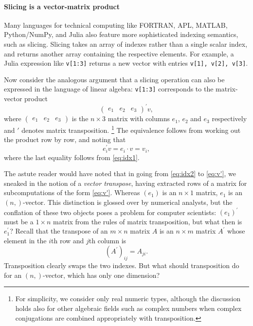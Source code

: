\paragraph{Slicing is a vector-matrix product}
Many languages for technical computing like FORTRAN, APL, MATLAB, Python/NumPy,
and Julia also feature more sophisticated indexing semantics, such as slicing.
Slicing takes an array of indexes rather than a single scalar index, and returns
another array containing the respective elements. For example, a Julia
expression like \lstinline|v[1:3]| returns a new vector with entries
\lstinline|v[1], v[2], v[3]|.

Now consider the analogous argument that a slicing operation can also be
expressed in the language of linear algebra: \lstinline|v[1:3]| corresponds to
the matrix-vector product
\begin{equation}
	\begin{pmatrix}e_1 & e_2 & e_3\end{pmatrix}^\prime v,\label{eq:idx2}
\end{equation}
where $\begin{pmatrix}e_1 & e_2 & e_3\end{pmatrix}$ is the $n \times 3$
matrix with columns $e_1$, $e_2$ and $e_3$ respectively and $'$ denotes matrix
transposition.%
\footnote{For simplicity, we consider only real numeric types, although the
discussion holds also for other algebraic fields such as complex numbers when
complex conjugations are combined appropriately with transposition.}
The equivalence follows from working out the product row by row,
and noting that
\begin{equation}
	e_i^\prime v = e_i \cdot v = v_i,\label{eq:v'}
\end{equation}
where the last equality follows from \eqref{eq:idx1}.

The astute reader would have noted that in going from \eqref{eq:idx2} to
\eqref{eq:v'}, we sneaked in the notion of a \textit{vector transpose}, having
extracted rows of a matrix for subcomputations of the form \eqref{eq:v'}.
Whereas $(e_1)$ is an $n \times 1$ matrix, $e_1$ is an $(n,)$-vector. This
distinction is glossed over by numerical analysts, but the conflation of these
two objects poses a problem for computer scientists: $(e_1)^\prime$ must be
a $1 \times n$ matrix from the rules of matrix transposition, but what then is
$e_1^\prime$? Recall that the transpose of an $m \times n$ matrix $A$ is an
$n \times m$ matrix $A^\prime$ whose element in the $i$th row and $j$th column
is
\begin{equation}
	\left(A^\prime\right)_{ij} = A_{ji}.\label{eq:A'}
\end{equation}
Transposition clearly swaps the two indexes. But what should transposition do
for an $(n,)$-vector, which has only one dimension?

